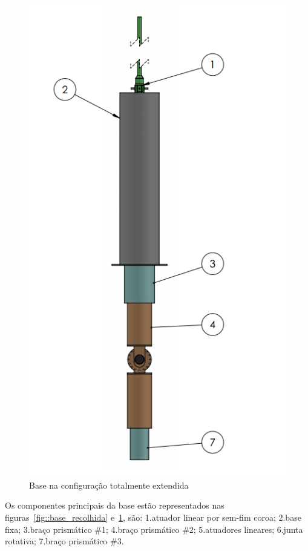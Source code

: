 \begin{figure}[h!]
\centering
	\includegraphics[width=\columnwidth]{figs/estudo/solid/Base_Extendida} 
	\caption{Base na configuração totalmente extendida}
	\label{fig::base_extendida}
\end{figure}

Os componentes principais da base estão representados nas
figuras~\ref{fig::base_recolhida} e~\ref{fig::base_extendida}, são: 1.atuador
linear por sem-fim coroa; 2.base fixa; 3.braço prismático \#1; 4.braço
prismático \#2; 5.atuadores lineares; 6.junta rotativa; 7.braço prismático \#3.

